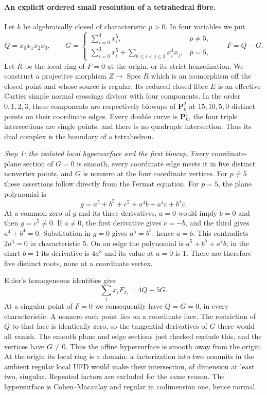 \paragraph{An explicit ordered small resolution of a tetrahedral fibre.}
Let $k$ be algebraically closed of characteristic $p>0$.  In four
variables we put
\begin{equation}
 Q=x_0x_1x_2x_3,\qquad
 G=\begin{cases}
 \sum_{i=0}^3x_i^5,&p\ne5,\\
 \sum_{i=0}^3x_i^5+\sum_{0\le i<j\le3}x_i^4x_j,&p=5,
 \end{cases}
 \qquad F=Q-G.
 \tag{TG.1}
\end{equation}
Let $R$ be the local ring of $F=0$ at the origin, or its strict
henselization.  We construct a projective morphism $Z\to\operatorname{Spec}R$
which is an isomorphism off the closed point and whose source is regular.
Its reduced closed fibre $E$ is an effective Cartier simple normal
crossings divisor with four components.  In the order $0,1,2,3$, these
components are respectively blowups of $\mathbf P^2_k$ at $15,10,5,0$
distinct points on their coordinate edges.  Every double curve is
$\mathbf P^1_k$, the four triple intersections are single points, and
there is no quadruple intersection.  Thus its dual complex is the
boundary of a tetrahedron.

\emph{Step 1: the isolated local hypersurface and the first blowup.}
Every coordinate-plane section of $G=0$ is smooth, every coordinate
edge meets it in five distinct nonvertex points, and $G$ is nonzero at
the four coordinate vertices.  For $p\ne5$ these assertions follow
directly from the Fermat equation.  For $p=5$, the plane polynomial is
\[
 g=a^5+b^5+c^5+a^4b+a^4c+b^4c.
\]
At a common zero of $g$ and its three derivatives, $a=0$ would imply
$b=0$ and then $g=c^5\ne0$.  If $a\ne0$, the first derivative gives
$c=-b$, and the third gives $a^4+b^4=0$.  Substitution in $g=0$ gives
$a^5=b^5$, hence $a=b$.  This contradicts $2a^4=0$ in characteristic
$5$.  On an edge the polynomial is $a^5+b^5+a^4b$; in the chart $b=1$
its derivative is $4a^3$ and its value at $a=0$ is $1$.  There are
therefore five distinct roots, none at a coordinate vertex.

Euler's homogeneous identities give
\[
 \sum_i x_iF_{x_i}=4Q-5G.
\]
At a singular point of $F=0$ we consequently have $Q=G=0$, in every
characteristic.  A nonzero such point lies on a coordinate face.  The
restriction of $Q$ to that face is identically zero, so the tangential
derivatives of $G$ there would all vanish.  The smooth plane and edge
sections just checked exclude this, and the vertices have $G\ne0$.
Thus the affine hypersurface is smooth away from the origin.  At the
origin its local ring is a domain: a factorization into two nonunits
in the ambient regular local UFD would make their intersection, of
dimension at least two, singular.  Repeated factors are excluded for
the same reason.  The hypersurface is Cohen--Macaulay and regular in
codimension one, hence normal.

